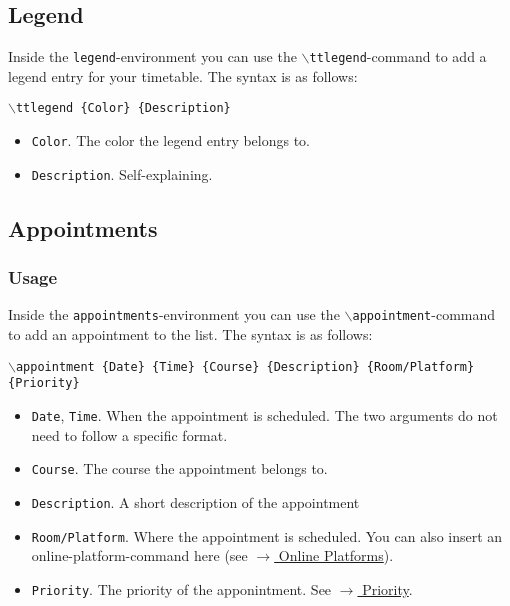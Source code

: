 \documentclass{article}
\newcommand{\cmd}[1]{$\backslash$\texttt{{#1}}}
\begin{document}
	\subsection{Legend}
	\label{legend}	
	Inside the \texttt{legend}-environment you can use the \cmd{ttlegend}-command to add a legend entry for your timetable. The syntax is as follows:
	\begin{center}
		\cmd{ttlegend \{Color\} \{Description\}}
	\end{center}
	\begin{itemize}
		\item \texttt{Color}.
		The color the legend entry belongs to.
		
		\item \texttt{Description}.
		Self-explaining.			
	\end{itemize}
	
	
	\subsection{Appointments}
	\label{appointments}
	\subsubsection{Usage}
	Inside the \texttt{appointments}-environment you can use the \cmd{appointment}-command to add an appointment to the list. The syntax is as follows:
	\begin{center}
		\cmd{appointment \{Date\} \{Time\} \{Course\} \{Description\} \{Room/Platform\} \{Priority\}}
	\end{center}
	\begin{itemize}
		\item \texttt{Date}, \texttt{Time}.
		When the appointment is scheduled. The two arguments do not need to follow a specific format.
		
		\item \texttt{Course}.
		The course the appointment belongs to.
					
		\item \texttt{Description}.
		A short description of the appointment
		
		\item \texttt{Room/Platform}.
		Where the appointment is scheduled. You can also insert an online-platform-command here (see \hyperref[online]{$\rightarrow$ Online Platforms}). 
			
		\item \texttt{Priority}.
		The priority of the apponintment. See \hyperref[priority]{$\rightarrow$ Priority}.
	\end{itemize}
	
\end{document}

